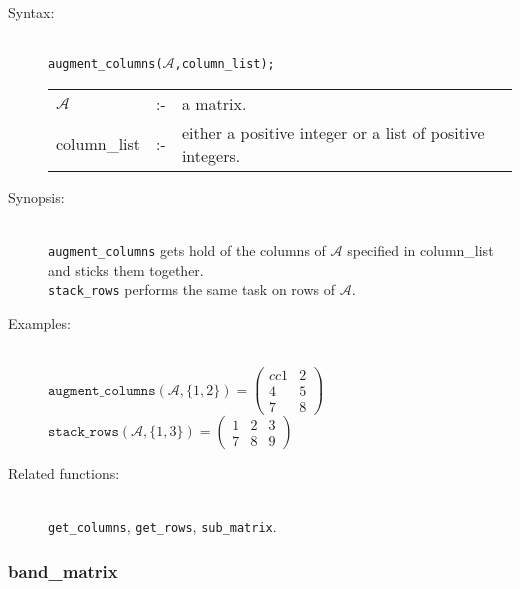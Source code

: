 \begin{description}
\item[Syntax:]\mbox{}\\
 \texttt{augment\_columns($\mathcal{A}$,column\_list);}\\[2mm]
\begin{tabular}{l l l}
$\mathcal{A}$  &:-& a matrix. \\
column\_list &:-&  either a positive integer or a list of positive
                   integers.
\end{tabular}

\item[Synopsis:]\mbox{}\\
\texttt{augment\_columns} gets hold of the columns of $\mathcal{A}$ specified
in column\_list and sticks them together. \\
\texttt{stack\_rows} performs the same task on rows of
                $\mathcal{A}$.

\item[Examples:]\mbox{}\\
  \(\texttt{augment\_columns}(\mathcal{A},\{1,2\})  =
  \begin{pmatrix}{cc} 1 & 2 \\ 4 & 5 \\ 7 & 8  \end{pmatrix}\) \\[2mm]
  \(\texttt{stack\_rows}(\mathcal{A},\{1,3\})  =
  \begin{pmatrix} 1 & 2 & 3 \\ 7 & 8 & 9 \end{pmatrix}\)

\item[Related functions:]\mbox{}\\
\texttt{get\_columns}, \texttt{get\_rows},
\texttt{sub\_matrix}.
\end{description}


\subsubsection{band\_matrix}
\label{linalg:band_matrix}

